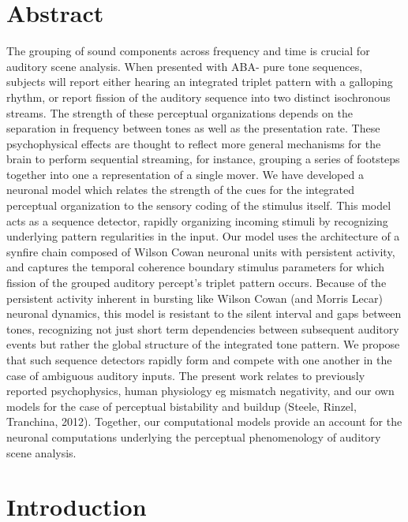 \section{Abstract}

The grouping of sound components across frequency and time is crucial for auditory scene analysis. When presented with ABA- pure tone sequences, subjects will report either hearing an integrated triplet pattern with a galloping rhythm, or report fission of the auditory sequence into two distinct isochronous streams. The strength of these perceptual organizations depends on the separation in frequency between tones as well as the presentation rate. These psychophysical effects are thought to reflect more general mechanisms for the brain to perform sequential streaming, for instance, grouping a series of footsteps together into one a representation of a single mover. We have developed a neuronal model which relates the strength of the cues for the integrated perceptual organization to the sensory coding of the stimulus itself. This model acts as a sequence detector, rapidly organizing incoming stimuli by recognizing underlying pattern regularities in the input. Our model uses the architecture of a synfire chain composed of Wilson Cowan neuronal units with persistent activity, and captures the temporal coherence boundary stimulus parameters for which fission of the grouped auditory percept's triplet pattern occurs. Because of the persistent activity inherent in bursting like Wilson Cowan (and Morris Lecar) neuronal dynamics, this model is resistant to the silent interval and gaps between tones, recognizing not just short term dependencies between subsequent auditory events but rather the global structure of the integrated tone pattern. We propose that such sequence detectors rapidly form and compete with one another in the case of ambiguous auditory inputs. The present work relates to previously reported psychophysics, human physiology eg mismatch negativity, and our own models for the case of perceptual bistability and buildup (Steele, Rinzel, Tranchina, 2012). Together, our computational models provide an account for the neuronal computations underlying the perceptual phenomenology of auditory scene analysis.

\section{
Introduction 
} 

